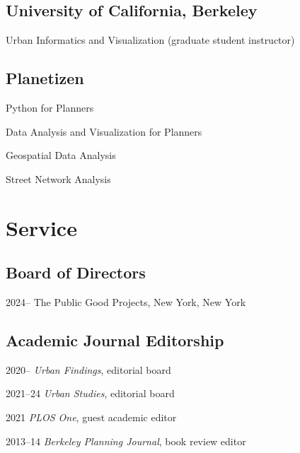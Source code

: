 \documentclass[11pt,letterpaper]{report}
\newcommand{\listitemspace}{0.25em}
\renewenvironment{itemize}
{\begin{list}{}{\setlength{\leftmargin}{0em}
                \setlength{\parskip}{0em}
                \setlength{\itemsep}{\listitemspace}
                \setlength{\parsep}{\listitemspace}}}
{\end{list}}
\begin{document}
    \subsection*{University of California, Berkeley}

    \begin{itemize}

        \item Urban Informatics and Visualization (graduate student instructor)

    \end{itemize}

    \subsection*{Planetizen}

    \begin{itemize}

        \item Python for Planners
        \item Data Analysis and Visualization for Planners
        \item Geospatial Data Analysis
        \item Street Network Analysis

    \end{itemize}



    \section*{Service}

   \subsection*{Board of Directors}

   \begin{tablist}

       \item[2024--]    \tab{}The Public Good Projects, New York, New York

   \end{tablist}

    \subsection*{Academic Journal Editorship}

    \begin{tablist}

        \item[2020--]   \tab{}\textit{Urban Findings}, editorial board
        \item[2021--24] \tab{}\textit{Urban Studies}, editorial board
        \item[2021]     \tab{}\textit{PLOS One}, guest academic editor
        \item[2013--14] \tab{}\textit{Berkeley Planning Journal}, book review editor

    \end{tablist}
\end{document}
